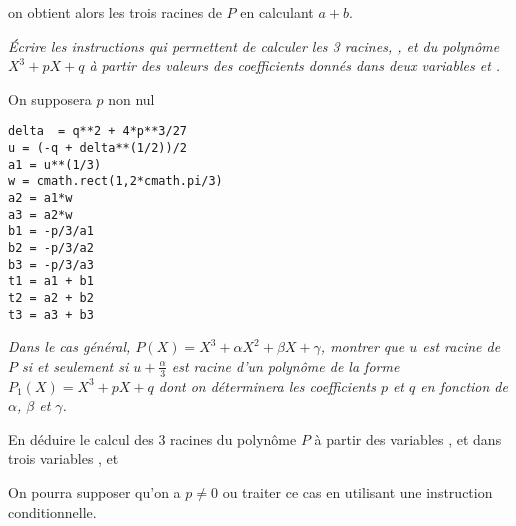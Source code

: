 on obtient alors les trois racines de $P$ en calculant $a+b$.
\begin{Exercise}
{\it Écrire les instructions qui permettent de calculer les 3 racines, ,  et  du polynôme $X^3+pX+q$ à partir des valeurs des coefficients donnés dans deux variables  et .

On supposera $p$ non nul}
\end{Exercise}
\begin{Answer}
\begin{lstlisting}
delta  = q**2 + 4*p**3/27
u = (-q + delta**(1/2))/2
a1 = u**(1/3)
w = cmath.rect(1,2*cmath.pi/3)
a2 = a1*w
a3 = a2*w 
b1 = -p/3/a1
b2 = -p/3/a2
b3 = -p/3/a3
t1 = a1 + b1
t2 = a2 + b2
t3 = a3 + b3
\end{lstlisting}
\newpage
\end{Answer}
\begin{Exercise}
{\it Dans le cas général, $P(X)=X^3+\alpha X^2+\beta X+\gamma$, montrer que $u$ est racine de $P$ si et seulement si $u+\frac \alpha 3$ est racine d'un polynôme de la forme $P_1(X)=X^3+pX+q$ dont on déterminera les coefficients $p$ et $q$ en fonction de $\alpha$, $\beta$  et $\gamma$.

En déduire le calcul des 3 racines du  polynôme $P$ à partir des variables ,  et  dans trois variables ,  et 

On pourra supposer qu'on a $p\ne 0$ ou traiter ce cas en utilisant une instruction conditionnelle.}
\end{Exercise}
